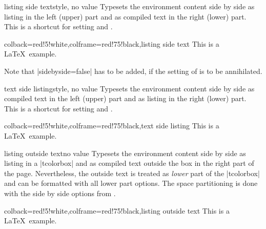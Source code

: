 \clearpage
\begin{docTcbKey}{listing side text}{}{style, no value}
Typesets the environment content side by side as listing in the left (upper)
part and as compiled text in the right (lower) part.
This is a shortcut for setting  and .
\begin{dispExample}
\begin{tcblisting}{colback=red!5!white,colframe=red!75!black,listing side text}
This is a \LaTeX\ example.
\end{tcblisting}
\end{dispExample}
\begin{marker}
Note that |sidebyside=false| has to be added, if the setting of
 is to be annihilated.
\end{marker}
\end{docTcbKey}


\begin{docTcbKey}{text side listing}{}{style, no value}
Typesets the environment content side by side as compiled text in the left (upper)
part and as listing in the right (lower) part.
This is a shortcut for setting  and .
\begin{dispExample}
\begin{tcblisting}{colback=red!5!white,colframe=red!75!black,text side listing}
This is a \LaTeX\ example.
\end{tcblisting}
\end{dispExample}
\end{docTcbKey}


\begin{docTcbKey}{listing outside text}{}{no value}
Typesets the environment content side by side as listing in a |tcolorbox|
and as compiled text outside the box in the right part of the page.
Nevertheless, the outside text is treated as \emph{lower} part of the
|tcolorbox| and can be formatted with all lower part options.
The space partitioning is done with the side by side options from
.
\begin{dispExample}
\begin{tcblisting}{colback=red!5!white,colframe=red!75!black,listing outside text}
This is a \LaTeX\ example.
\end{tcblisting}
\end{dispExample}
\end{docTcbKey}

\clearpage

